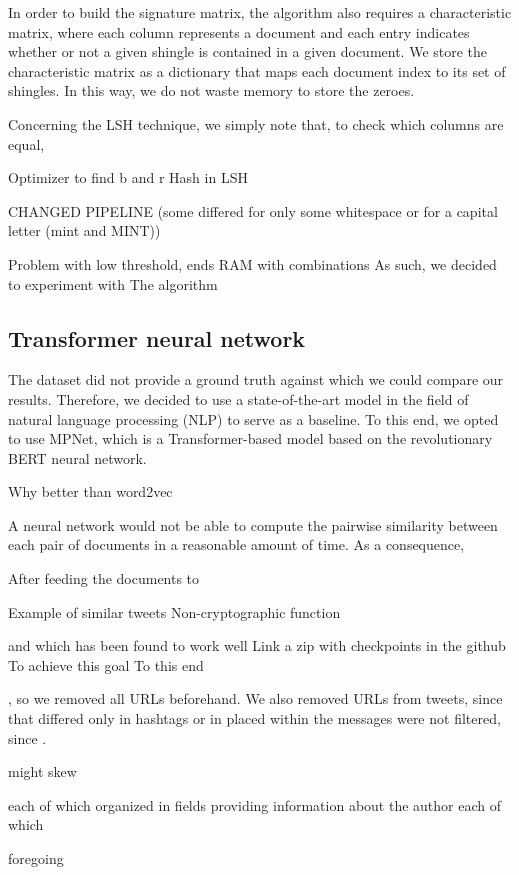 \documentclass[runningheads]{llncs}
\begin{document}
In order to build the signature matrix, the algorithm also requires a characteristic matrix, where each column represents a document and each entry indicates whether or not a given shingle is contained in a given document. We store the characteristic matrix as a dictionary that maps each document index to its set of shingles. In this way, we do not waste memory to store the zeroes.

Concerning the LSH technique, we simply note that, to check which columns are equal, 

Optimizer to find b and r
Hash in LSH

CHANGED PIPELINE (some differed for only some whitespace or for a capital letter (mint and MINT))

Problem with low threshold, ends RAM with combinations
As such, we decided to experiment with   
The algorithm 

\subsection{Transformer neural network}
\label{subsec:models:transformer}

The dataset did not provide a ground truth against which we could compare our results. Therefore, we decided to use a state-of-the-art model in the field of natural language processing (NLP) to serve as a baseline. To this end, we opted to use MPNet, which is a Transformer-based model based on the revolutionary BERT neural network. 

Why better than word2vec

A neural network would not be able to compute the pairwise similarity between each pair of documents in a reasonable amount of time. As a consequence, 

After feeding the documents to 

Example of similar tweets
Non-cryptographic function

and which has been found to work well  
Link a zip with checkpoints in the github
To achieve this goal
To this end

, so we removed all URLs 
beforehand. 
We also removed URLs from tweets, since that differed only in hashtags or in  placed within the messages were not filtered, since . 

might skew

each of which organized in fields providing information about the author
each of which  

foregoing
\end{document}
